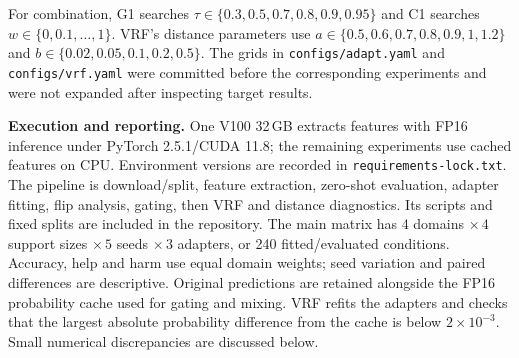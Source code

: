 For combination, G1 searches $\tau\in\{0.3,0.5,0.7,0.8,0.9,0.95\}$ and C1 searches $w\in\{0,0.1,\ldots,1\}$. VRF's distance parameters use $a\in\{0.5,0.6,0.7,0.8,0.9,1,1.2\}$ and $b\in\{0.02,0.05,0.1,0.2,0.5\}$. The grids in \texttt{configs/adapt.yaml} and \texttt{configs/vrf.yaml} were committed before the corresponding experiments and were not expanded after inspecting target results.

\textbf{Execution and reporting.}
One V100 32\,GB extracts features with FP16 inference under PyTorch 2.5.1/CUDA 11.8; the remaining experiments use cached features on CPU. Environment versions are recorded in \texttt{requirements-lock.txt}. The pipeline is download/split, feature extraction, zero-shot evaluation, adapter fitting, flip analysis, gating, then VRF and distance diagnostics. Its scripts and fixed splits are included in the repository. The main matrix has $4$ domains $\times\,4$ support sizes $\times\,5$ seeds $\times\,3$ adapters, or 240 fitted/evaluated conditions. Accuracy, help and harm use equal domain weights; seed variation and paired differences are descriptive. Original predictions are retained alongside the FP16 probability cache used for gating and mixing. VRF refits the adapters and checks that the largest absolute probability difference from the cache is below $2\times10^{-3}$. Small numerical discrepancies are discussed below.
